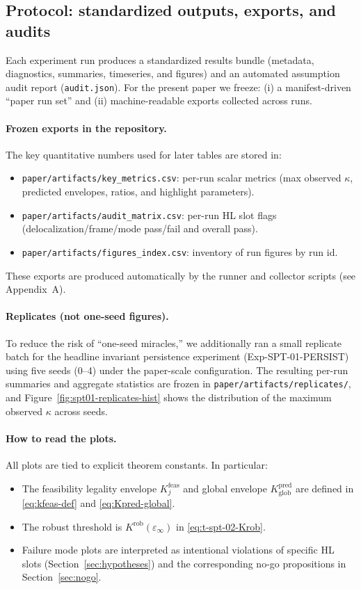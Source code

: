 \documentclass[11pt]{article}
\begin{document}
\subsection{Protocol: standardized outputs, exports, and audits}

Each experiment run produces a standardized results bundle (metadata, diagnostics, summaries, timeseries, and figures) and an automated assumption audit report (\texttt{audit.json}).
For the present paper we freeze:
(i) a manifest-driven ``paper run set'' and
(ii) machine-readable exports collected across runs.

\paragraph{Frozen exports in the repository.}
The key quantitative numbers used for later tables are stored in:
\begin{itemize}
\item \texttt{paper/artifacts/key\_metrics.csv}: per-run scalar metrics (max observed $\kappa$, predicted envelopes, ratios, and highlight parameters).
\item \nolinkurl{paper/artifacts/audit_matrix.csv}: per-run HL slot flags (delocalization/\allowbreak frame/\allowbreak mode pass/fail and overall pass).
\item \texttt{paper/artifacts/figures\_index.csv}: inventory of run figures by run id.
\end{itemize}
These exports are produced automatically by the runner and collector scripts (see Appendix~A).

\paragraph{Replicates (not one-seed figures).}
To reduce the risk of ``one-seed miracles,'' we additionally ran a small replicate batch for the headline invariant persistence experiment (Exp-SPT-01-PERSIST) using five seeds (0--4) under the paper-scale configuration.
The resulting per-run summaries and aggregate statistics are frozen in \texttt{paper/artifacts/replicates/}, and Figure~\ref{fig:spt01-replicates-hist} shows the distribution of the maximum observed $\kappa$ across seeds.

\paragraph{How to read the plots.}
All plots are tied to explicit theorem constants.
In particular:
\begin{itemize}
\item The feasibility legality envelope $K^{\mathrm{feas}}_j$ and global envelope $K^{\mathrm{pred}}_{\mathrm{glob}}$ are defined in \eqref{eq:kfeas-def} and \eqref{eq:Kpred-global}.
\item The robust threshold is $K^{\mathrm{rob}}(\varepsilon_\infty)$ in \eqref{eq:t-spt-02-Krob}.
\item Failure mode plots are interpreted as intentional violations of specific HL slots (Section~\ref{sec:hypotheses}) and the corresponding no-go propositions in Section~\ref{sec:nogo}.
\end{itemize}
\end{document}
